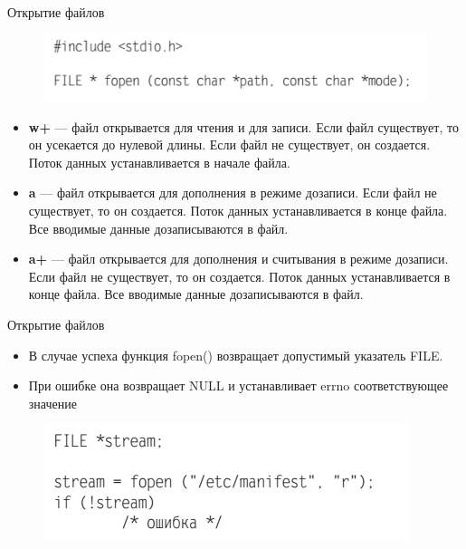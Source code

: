 \documentclass{beamer}
\begin{document}
\begin{frame}{Открытие файлов}
\begin{figure}[h]
\centering
\includegraphics[scale=0.5]{images/lec05-pic04.png}
\end{figure}
\begin{itemize}
\item \textbf{w+} — файл открывается для чтения и для записи. Если файл существует, то он
усекается до нулевой длины. Если файл не существует, он создается. Поток
данных устанавливается в начале файла.
\item \textbf{a} — файл открывается для дополнения в режиме дозаписи. Если файл не существует, то он создается. Поток данных устанавливается в конце файла. Все вводимые данные дозаписываются в файл.
\item \textbf{a+} — файл открывается для дополнения и считывания в режиме дозаписи. Если файл не существует, то он создается. Поток данных устанавливается в конце файла. Все вводимые данные дозаписываются в файл.
\end{itemize}
\end{frame}

\begin{frame}{Открытие файлов}
\begin{itemize}
\item В случае успеха функция fopen() возвращает допустимый указатель FILE. 
\item При ошибке она возвращает NULL и устанавливает errno соответствующее значение
\end{itemize}
\begin{figure}[h]
\centering
\includegraphics[scale=0.75]{images/lec05-pic05.png}
\end{figure}
\end{frame}
\end{document}
